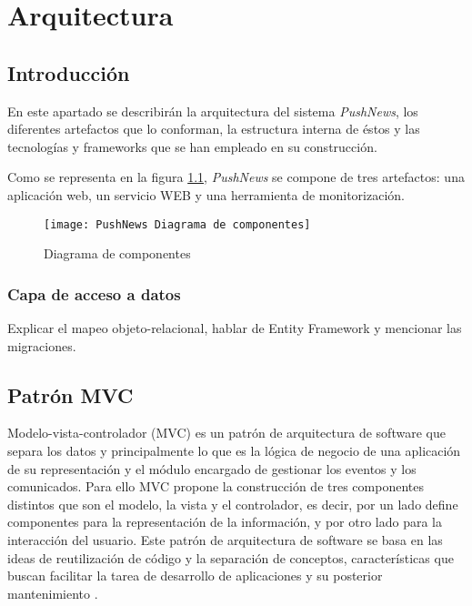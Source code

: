 \chapter{Arquitectura}

\section{Introducción}
En este apartado se describirán la arquitectura del sistema \emph{PushNews}, los diferentes artefactos que lo conforman, la estructura interna de éstos y las tecnologías y frameworks que se han empleado en su construcción.

Como se representa en la figura \ref{fig:diagrama-componentes}, \emph{PushNews} se compone de tres artefactos: una aplicación web, un servicio WEB y una herramienta de monitorización.

\begin{figure}[hb]
  \centering
  \texttt{[image: PushNews Diagrama de componentes]}
  \caption{Diagrama de componentes}
  \label{fig:diagrama-componentes}
\end{figure}

\subsection{Capa de acceso a datos}
Explicar el mapeo objeto-relacional, hablar de Entity Framework y mencionar las migraciones.

\section{Patrón MVC}

Modelo-vista-controlador (MVC) es un patrón de arquitectura de software que separa los datos y principalmente lo que es la lógica de negocio de una aplicación de su representación y el módulo encargado de gestionar los eventos y los comunicados. Para ello MVC propone la construcción de tres componentes distintos que son el modelo, la vista y el controlador, es decir, por un lado define componentes para la representación de la información, y por otro lado para la interacción del usuario. Este patrón de arquitectura de software se basa en las ideas de reutilización de código y la separación de conceptos, características que buscan facilitar la tarea de desarrollo de aplicaciones y su posterior mantenimiento \cite{wiki-mvc}.

